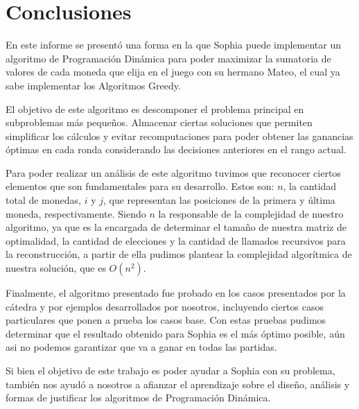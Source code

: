 \section{Conclusiones}
En este informe se presentó una forma en la que Sophia puede implementar un algoritmo de Programación Dinámica para poder maximizar la sumatoria de valores de cada moneda que elija en el juego con su hermano Mateo, el cual ya sabe implementar los Algoritmos Greedy.

El objetivo de este algoritmo es descomponer el problema principal en subproblemas más pequeños. Almacenar ciertas soluciones que permiten simplificar los cálculos y evitar recomputaciones para poder obtener las ganancias óptimas en cada ronda considerando las decisiones anteriores en el rango actual.

Para poder realizar un análisis de este algoritmo tuvimos que reconocer ciertos elementos que son fundamentales para su desarrollo. Estos son: $n$, la cantidad total de monedas, $i$ y $j$, que representan las posiciones de la primera y última moneda, respectivamente. Siendo $n$ la responsable de la complejidad de nuestro algoritmo, ya que es la encargada de determinar el tamaño de nuestra matriz de optimalidad, la cantidad de elecciones y la cantidad de llamados recursivos para la reconstrucción, a partir de ella pudimos plantear la complejidad algorítmica de nuestra solución, que es $O(n^2)$.

Finalmente, el algoritmo presentado fue probado en los casos presentados por la cátedra y por ejemplos desarrollados por nosotros, incluyendo ciertos casos particulares que ponen a prueba los casos base. Con estas pruebas pudimos determinar que el resultado obtenido para Sophia es el más óptimo posible, aún asi no podemos garantizar que va a ganar en todas las partidas.

Si bien el objetivo de este trabajo es poder ayudar a Sophia con su problema, también nos ayudó a nosotros a afianzar el aprendizaje sobre el diseño, análisis y formas de justificar los algoritmos de Programación Dinámica.